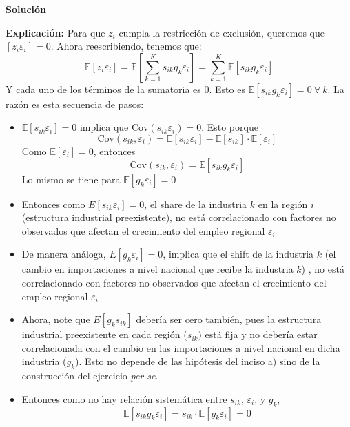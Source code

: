 \documentclass[a4paper, answers, addpoints, 11pt]{exam}
\newenvironment{solucion}{%
  \begin{mdframed}[
    backgroundcolor=blue!5,    %
    linecolor=blue!50,          %
    linewidth=2pt,              %
    leftmargin=10pt,            %
    rightmargin=8pt,           %
    topline=true,              %
    bottomline=true,            %
    roundcorner=10pt,           %
    innerleftmargin=10pt,       %
    innerrightmargin=10pt,      %
    innerbottommargin=10pt,     %
    innertopmargin=10pt         %
  ]%
  \begin{tcolorbox}[colframe=blue!50!black, colback=blue!50, coltitle=white, sharp corners=all, boxrule=1mm, width=\textwidth, halign=left, valign=center, top=0mm, bottom=0mm, left=0mm, right=0mm] \textbf{Solución} \end{tcolorbox} }{\end{mdframed}}
\begin{document}
\begin{enumerate}
\begin{itemize}
\begin{solucion}
        \textbf{Explicación:} Para que $z_i$ cumpla la restricción de exclusión, queremos que $[z_i \varepsilon_i]=0$. Ahora reescribiendo, tenemos que:
        \begin{equation}\label{exogeneidad3}
    \mathbb{E}[z_i \varepsilon_i] = \mathbb{E} \left[ \sum_{k=1}^K s_{ik} g_k \varepsilon_i \right] = \sum_{k=1}^K \mathbb{E}[s_{ik} g_k \varepsilon_i]
\end{equation}
Y cada uno de los términos de la sumatoria es 0. Esto es $\mathbb{E}[s_{ik} g_k \varepsilon_i]=0 \: \forall \:k.$ La razón es esta secuencia de pasos:
\begin{itemize}
    \item $\mathbb{E}[s_{ik}  \varepsilon_i] = 0 $ implica que $ \text{Cov}(s_{ik}\varepsilon_i)=0$. Esto porque  \begin{equation*}\text{Cov}(s_{ik}, \varepsilon_i) =
\mathbb{E}[s_{ik} \varepsilon_i] - \mathbb{E}[s_{ik}] \cdot \mathbb{E}[\varepsilon_i]
\end{equation*}
Como  \( \mathbb{E}[\varepsilon_i] = 0 \), entonces 
 \begin{equation*}
        \text{Cov}(s_{ik},  \varepsilon_i) =
\mathbb{E}[s_{ik} g_k \varepsilon_i] 
\end{equation*}
Lo mismo se tiene para $\mathbb{E}[ g_k \varepsilon_i] =0$
    \item Entonces como $E[s_{ik}\varepsilon_i] = 0$, el share de la industria $k$ en la región $i$ (estructura industrial preexistente), no está correlacionado con  factores no observados que afectan el crecimiento del empleo regional $\varepsilon_i$ 
    \item De manera análoga, $E[g_{k}\varepsilon_i] = 0$, implica que el shift de la industria $k$ (el cambio en importaciones a nivel nacional que recibe la industria $k$) , no está correlacionado con  factores no observados que afectan el crecimiento del empleo regional $\varepsilon_i$ 
    \item Ahora,  note que $E[g_{k}s_{ik}]$ debería ser cero también, pues la estructura industrial preexistente en cada región ($s_{ik})$ está fija y no debería estar correlacionada con el cambio en las importaciones a nivel nacional en dicha industria ($g_{k}$). Esto no depende de las hipótesis del inciso a) sino de la construcción del ejercicio \textit{per se}.
    \item Entonces como no hay relación sistemática entre \(s_{ik}\), \(\varepsilon_i\), y \(g_k\), 
    \[\mathbb{E}[s_{ik} g_k \varepsilon_i] =
 s_{ik} \cdot \mathbb{E}[g_k \varepsilon_i] =0  
\] 
\end{itemize} 


\end{solucion}
\end{itemize}
\end{enumerate}
\end{document}

